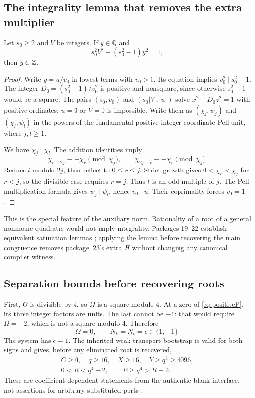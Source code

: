 \subsection{The integrality lemma that removes the extra multiplier}

\begin{lemma}\label{lem:saturation}
Let $s_0\ge2$ and $V$ be integers. If $y\in\mathbb Q$ and
\[
 s_0^2V^2-(s_0^2-1)y^2=1,
\]
then $y\in\mathbb Z$.
\end{lemma}
\begin{proof}
Write $y=u/v_0$ in lowest terms with $v_0>0$. Its equation implies
$v_0^2\mid s_0^2-1$. The integer
$D_0=(s_0^2-1)/v_0^2$ is positive and nonsquare, since otherwise
$s_0^2-1$ would be a square. The pairs
$(s_0,v_0)$ and $(s_0|V|,|u|)$ solve $x^2-D_0z^2=1$ with positive
ordinates; $u=0$ or $V=0$ is impossible. Write them as
$(\chi_j,\psi_j)$ and $(\chi_l,\psi_l)$ in the powers of the fundamental
positive integer-coordinate Pell unit, where $j,l\ge1$.

We have $\chi_j\mid\chi_l$. The addition identities imply
\[
 \chi_{r+2j}\equiv-\chi_r\pmod{\chi_j},\qquad
 \chi_{2j-r}\equiv-\chi_r\pmod{\chi_j}.
\]
Reduce $l$ modulo $2j$, then reflect to $0\le r\le j$.
Strict growth gives $0<\chi_r<\chi_j$ for $r<j$, so the divisible
case requires $r=j$. Thus $l$ is an odd multiple of $j$.
The Pell multiplication formula gives $\psi_j\mid\psi_l$, hence
$v_0\mid u$. Their coprimality forces $v_0=1$.
\end{proof}

This is the special feature of the auxiliary norm. Rationality of a root
of a general nonmonic quadratic would not imply integrality. Packages
19--22 establish equivalent saturation lemmas
\cite{repo19,repo20,repo21}; applying the lemma before recovering the main
congruence removes package~23's extra $H$ without changing any canonical
compiler witness.

\subsection{Separation bounds before recovering roots}

First, $\Theta$ is divisible by $4$, so $\Omega$ is a square modulo $4$.
At a zero of \eqref{eq:positiveP}, its three integer factors are units.
The last cannot be $-1$: that would require $\Omega=-2$, which is not a
square modulo $4$. Therefore
\[
 \Omega=0,\qquad N_k=N_t=\epsilon\in\{1,-1\}.
\]
The system has $\epsilon=1$. The inherited weak transport bootstrap is
valid for both signs and gives, before any eliminated root is recovered,
\begin{equation}
 \begin{gathered}
 C\ge0,\quad q\ge16,\quad X\ge16,\quad Y\ge q^3\ge4096,\\
 0<R<q^4-2,\qquad E\ge q^4>R+2.
 \end{gathered}\label{eq:weakbounds}
\end{equation}
These are coefficient-dependent statements from the authentic blank
interface, not assertions for arbitrary substituted ports
\cite{normalized,repo20,repo21}.

